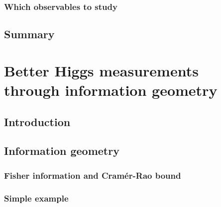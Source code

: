 \subsection{Which observables to study}

\section{Summary}
\label{sec:validity_summary}





\chapter{Better Higgs measurements through information geometry}
\label{chapter:information}


\section{Introduction}
\label{sec:information_intro}

\section{Information geometry}
\label{sec:information_formalism}

\subsection{Fisher information and Cram\'er-Rao bound}

\subsection{Simple example}



